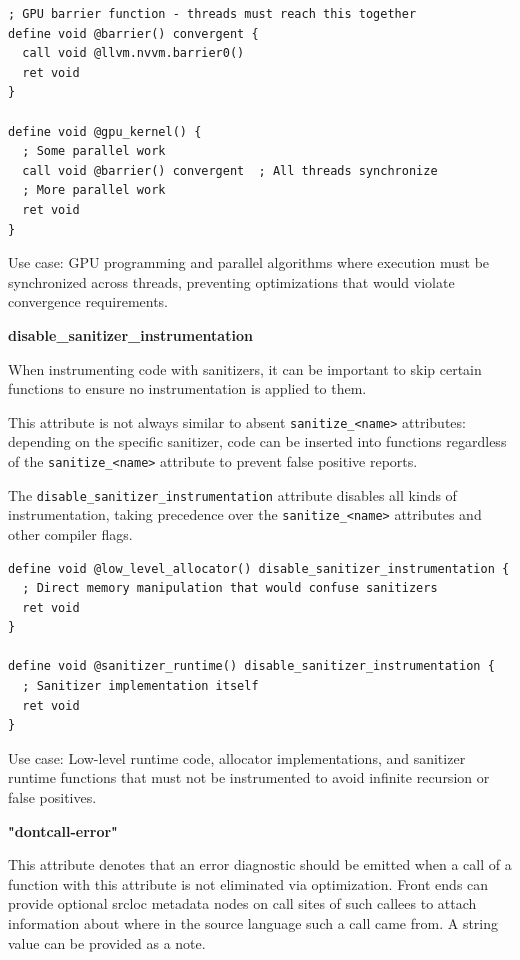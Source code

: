 \begin{lstlisting}[style=ir]
; GPU barrier function - threads must reach this together
define void @barrier() convergent {
  call void @llvm.nvvm.barrier0()
  ret void
}

define void @gpu_kernel() {
  ; Some parallel work
  call void @barrier() convergent  ; All threads synchronize
  ; More parallel work
  ret void
}
\end{lstlisting}

Use case: GPU programming and parallel algorithms where execution must be synchronized across threads, preventing optimizations that would violate convergence requirements.

\textbf{disable\_sanitizer\_instrumentation}

When instrumenting code with sanitizers, it can be important to skip certain functions to ensure no instrumentation is applied to them.

This attribute is not always similar to absent \texttt{sanitize\_<name>} attributes: depending on the specific sanitizer, code can be inserted into functions regardless of the \texttt{sanitize\_<name>} attribute to prevent false positive reports.

The \texttt{disable\_sanitizer\_instrumentation} attribute disables all kinds of instrumentation, taking precedence over the \texttt{sanitize\_<name>} attributes and other compiler flags.

\begin{lstlisting}[style=ir]
define void @low_level_allocator() disable_sanitizer_instrumentation {
  ; Direct memory manipulation that would confuse sanitizers
  ret void
}

define void @sanitizer_runtime() disable_sanitizer_instrumentation {
  ; Sanitizer implementation itself
  ret void
}
\end{lstlisting}

Use case: Low-level runtime code, allocator implementations, and sanitizer runtime functions that must not be instrumented to avoid infinite recursion or false positives.

\textbf{"dontcall-error"}

This attribute denotes that an error diagnostic should be emitted when a call of a function with this attribute is not eliminated via optimization.
Front ends can provide optional srcloc metadata nodes on call sites of such callees to attach information about where in the source language such a call came from.
A string value can be provided as a note.


